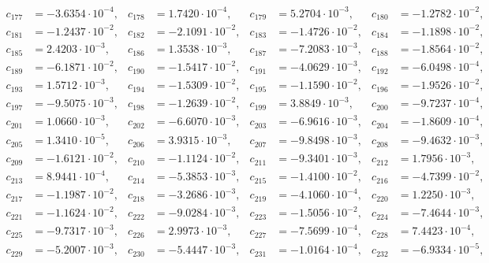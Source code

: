 \begin{align*}
c_{ 177 } &= -3.6354 \cdot 10^{ -4 }, & c_{ 178 } &= 1.7420 \cdot 10^{ -4 }, & c_{ 179 } &= 5.2704 \cdot 10^{ -3 }, & c_{ 180 } &= -1.2782 \cdot 10^{ -2 },\\ 
c_{ 181 } &= -1.2437 \cdot 10^{ -2 }, & c_{ 182 } &= -2.1091 \cdot 10^{ -2 }, & c_{ 183 } &= -1.4726 \cdot 10^{ -2 }, & c_{ 184 } &= -1.1898 \cdot 10^{ -2 },\\ 
c_{ 185 } &= 2.4203 \cdot 10^{ -3 }, & c_{ 186 } &= 1.3538 \cdot 10^{ -3 }, & c_{ 187 } &= -7.2083 \cdot 10^{ -3 }, & c_{ 188 } &= -1.8564 \cdot 10^{ -2 },\\ 
c_{ 189 } &= -6.1871 \cdot 10^{ -2 }, & c_{ 190 } &= -1.5417 \cdot 10^{ -2 }, & c_{ 191 } &= -4.0629 \cdot 10^{ -3 }, & c_{ 192 } &= -6.0498 \cdot 10^{ -4 },\\ 
c_{ 193 } &= 1.5712 \cdot 10^{ -3 }, & c_{ 194 } &= -1.5309 \cdot 10^{ -2 }, & c_{ 195 } &= -1.1590 \cdot 10^{ -2 }, & c_{ 196 } &= -1.9526 \cdot 10^{ -2 },\\ 
c_{ 197 } &= -9.5075 \cdot 10^{ -3 }, & c_{ 198 } &= -1.2639 \cdot 10^{ -2 }, & c_{ 199 } &= 3.8849 \cdot 10^{ -3 }, & c_{ 200 } &= -9.7237 \cdot 10^{ -4 },\\ 
c_{ 201 } &= 1.0660 \cdot 10^{ -3 }, & c_{ 202 } &= -6.6070 \cdot 10^{ -3 }, & c_{ 203 } &= -6.9616 \cdot 10^{ -3 }, & c_{ 204 } &= -1.8609 \cdot 10^{ -4 },\\ 
c_{ 205 } &= 1.3410 \cdot 10^{ -5 }, & c_{ 206 } &= 3.9315 \cdot 10^{ -3 }, & c_{ 207 } &= -9.8498 \cdot 10^{ -3 }, & c_{ 208 } &= -9.4632 \cdot 10^{ -3 },\\ 
c_{ 209 } &= -1.6121 \cdot 10^{ -2 }, & c_{ 210 } &= -1.1124 \cdot 10^{ -2 }, & c_{ 211 } &= -9.3401 \cdot 10^{ -3 }, & c_{ 212 } &= 1.7956 \cdot 10^{ -3 },\\ 
c_{ 213 } &= 8.9441 \cdot 10^{ -4 }, & c_{ 214 } &= -5.3853 \cdot 10^{ -3 }, & c_{ 215 } &= -1.4100 \cdot 10^{ -2 }, & c_{ 216 } &= -4.7399 \cdot 10^{ -2 },\\ 
c_{ 217 } &= -1.1987 \cdot 10^{ -2 }, & c_{ 218 } &= -3.2686 \cdot 10^{ -3 }, & c_{ 219 } &= -4.1060 \cdot 10^{ -4 }, & c_{ 220 } &= 1.2250 \cdot 10^{ -3 },\\ 
c_{ 221 } &= -1.1624 \cdot 10^{ -2 }, & c_{ 222 } &= -9.0284 \cdot 10^{ -3 }, & c_{ 223 } &= -1.5056 \cdot 10^{ -2 }, & c_{ 224 } &= -7.4644 \cdot 10^{ -3 },\\ 
c_{ 225 } &= -9.7317 \cdot 10^{ -3 }, & c_{ 226 } &= 2.9973 \cdot 10^{ -3 }, & c_{ 227 } &= -7.5699 \cdot 10^{ -4 }, & c_{ 228 } &= 7.4423 \cdot 10^{ -4 },\\ 
c_{ 229 } &= -5.2007 \cdot 10^{ -3 }, & c_{ 230 } &= -5.4447 \cdot 10^{ -3 }, & c_{ 231 } &= -1.0164 \cdot 10^{ -4 }, & c_{ 232 } &= -6.9334 \cdot 10^{ -5 },\\ 

\end{align*}
